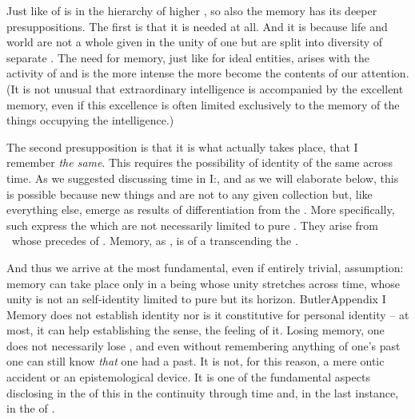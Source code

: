 \pa Just like  of  is  in the hierarchy
of higher , so also the  memory
has its deeper presuppositions.  The first is that it is needed at all. And it
is because life and world are not a whole given in the unity of one  but
are split into diversity of separate . The need for
 memory, just like for ideal entities, arises with the
 activity of  and is the more intense the more
 become the contents of our attention. (It is not
unusual that extraordinary intelligence is accompanied by the excellent memory,
even if this excellence is often limited exclusively to the memory of the things
occupying the intelligence.) 

The second presupposition is that it is what actually takes place, that I 
remember {\em the same}.  This  requires the
possibility of  identity of the same across time. As we
suggested discussing time in I:, and as we will
elaborate below, this is possible because new things and  are
not  to any given collection but, like everything else, emerge as
results of differentiation from the . More specifically,
such  express the  which are not necessarily
limited to pure \hoa. They arise from  \nexuss\ whose 
precedes  of . Memory, as , is  of a  transcending the
\hoa.

And thus we arrive at the most fundamental, even if entirely trivial,
assumption: memory can take place only in a being whose unity stretches across
time, whose unity is not an  self-identity limited to pure
 but  its horizon.  \citet{All beings confessedly
  continue the same, during the whole time of their existence. [...]  All these
  successive actions, enjoyments, and sufferings, are actions, enjoyments and
  sufferings, of the same living being. And they are so, prior to all
  consideration of its remembering and forgetting [...]}{Butler}{Appendix I}
Memory does not establish identity nor is it constitutive for personal identity
-- at most, it can help establishing the sense, the feeling of it. Losing
memory, one does not necessarily lose , and even without remembering
anything of one's past one can still know {\em that} one had a past. 
%
It is not, for this reason, a mere ontic accident or an
epistemological device.  It is one of the fundamental aspects disclosing in  
 the  of this 
in the continuity through time and, in the last instance, in the  of
. 



